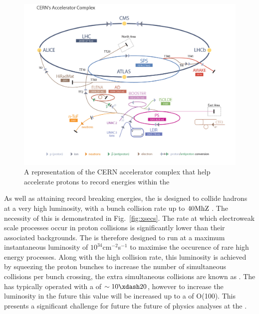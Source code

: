 \begin{figure}
  \includegraphics[width=\largefigwidth]{figs/LHC_default}
  \caption[]%
  {A representation of the CERN accelerator complex that help
  accelerate protons to record energies within the \LHC
  \cite{stfc:lhc}}%
  \label{fig:lhc}
\end{figure}

As well as attaining record breaking energies, the \LHC is designed to
collide hadrons at a very high luminosity, with a bunch collision rate
up to $40\text{MhZ}$ \cite{Evans:2008zzb}. The necessity of this is demonstrated in
Fig.~\ref{fig:xsecs}. The rate at which electroweak scale processes
occur in proton collisions is significantly lower than their
associated backgrounds. The \LHC is therefore designed to run at a
maximum instantaneous luminosity of $10^{34}$cm$^{-2}$s$^{-1}$ to
maximise the occurence of rare high energy processes. Along with
the high collision rate, this luminosity is achieved by squeezing the
proton bunches to increase the number of simultaneous collisions per
bunch crossing, the extra simultaneous collisions are known as \PU.
The \LHC has typically operated with a \PU of $\sim10\xdash20$,
however to increase the luminosity in the future this value will be
increased up to a \PU of O(100). This presents a significant challenge
for future the future of physics analyses at the \LHC.

